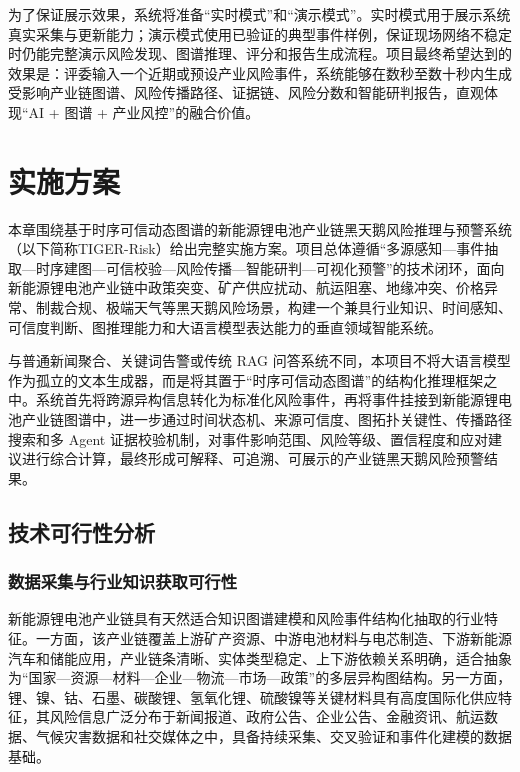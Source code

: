 \documentclass[12pt,a4paper]{article}
\newcommand{\projectname}{基于时序可信动态图谱的新能源锂电池产业链黑天鹅风险推理与预警系统}
\newcommand{\projectshort}{TIGER-Risk}
\begin{document}
为了保证展示效果，系统将准备“实时模式”和“演示模式”。实时模式用于展示系统真实采集与更新能力；演示模式使用已验证的典型事件样例，保证现场网络不稳定时仍能完整演示风险发现、图谱推理、评分和报告生成流程。项目最终希望达到的效果是：评委输入一个近期或预设产业风险事件，系统能够在数秒至数十秒内生成受影响产业链图谱、风险传播路径、证据链、风险分数和智能研判报告，直观体现“AI + 图谱 + 产业风控”的融合价值。


\section{实施方案}

本章围绕\projectname（以下简称\projectshort）给出完整实施方案。项目总体遵循“多源感知—事件抽取—时序建图—可信校验—风险传播—智能研判—可视化预警”的技术闭环，面向新能源锂电池产业链中政策突变、矿产供应扰动、航运阻塞、地缘冲突、价格异常、制裁合规、极端天气等黑天鹅风险场景，构建一个兼具行业知识、时间感知、可信度判断、图推理能力和大语言模型表达能力的垂直领域智能系统。

与普通新闻聚合、关键词告警或传统 RAG 问答系统不同，本项目不将大语言模型作为孤立的文本生成器，而是将其置于“时序可信动态图谱”的结构化推理框架之中。系统首先将跨源异构信息转化为标准化风险事件，再将事件挂接到新能源锂电池产业链图谱中，进一步通过时间状态机、来源可信度、图拓扑关键性、传播路径搜索和多 Agent 证据校验机制，对事件影响范围、风险等级、置信程度和应对建议进行综合计算，最终形成可解释、可追溯、可展示的产业链黑天鹅风险预警结果。

\subsection{技术可行性分析}

\subsubsection{数据采集与行业知识获取可行性}

新能源锂电池产业链具有天然适合知识图谱建模和风险事件结构化抽取的行业特征。一方面，该产业链覆盖上游矿产资源、中游电池材料与电芯制造、下游新能源汽车和储能应用，产业链条清晰、实体类型稳定、上下游依赖关系明确，适合抽象为“国家—资源—材料—企业—物流—市场—政策”的多层异构图结构。另一方面，锂、镍、钴、石墨、碳酸锂、氢氧化锂、硫酸镍等关键材料具有高度国际化供应特征，其风险信息广泛分布于新闻报道、政府公告、企业公告、金融资讯、航运数据、气候灾害数据和社交媒体之中，具备持续采集、交叉验证和事件化建模的数据基础。
\end{document}
